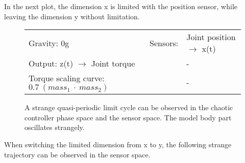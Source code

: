 \documentclass[main]{subfiles}
\begin{document}
In the next plot, the dimension x is limited with the position sensor, while leaving the dimension y without limitation.

\begin{figure}[H]
	\centering
		\begin{minipage}{1.3\textwidth}
	\hspace*{-5em}
	\end{minipage}
	\caption[Joint position \(\rightarrow\) x(t) limited chaotic controller controlling model leg.]{A strange quasi-periodic limit cycle can be observed in the chaotic controller phase space and the sensor space. The model body part oscillates strangely.}
	\begin{tabular}{l|ll}
	\hline 
	Gravity: 0g  & Sensors: & Joint position \(\rightarrow\) x(t)\\
	 Output: z(t) \(\rightarrow\) Joint torque & & - \\
	  Torque scaling curve: \(0.7~(mass_1~\cdot~mass_2)\) & & - \\
	  \hline
	\end{tabular}
	\label{figure:limited-model-leg1}
\end{figure}

When switching the limited dimension from x to y, the following strange trajectory can be observed in the sensor space.
\end{document}
